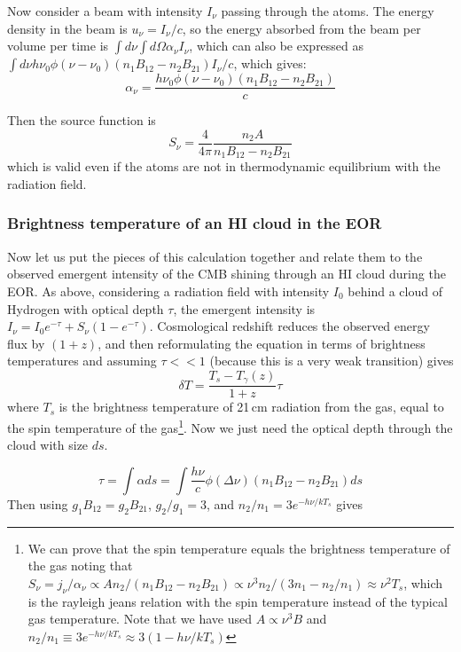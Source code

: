 Now consider a beam with intensity $I_\nu$ passing through the atoms. The energy density in the beam is $u_\nu=I_\nu/c$, so the energy absorbed from the beam per volume per time is $\int d\nu\int d\Omega\alpha_\nu I_\nu$, which can also be expressed as $\int d\nu h\nu_0\phi(\nu-\nu_0)(n_1B_{12}-n_2B_{21})I_\nu/c$, which gives:
\begin{equation}
\boxed{\alpha_\nu=\frac{h\nu_0\phi(\nu-\nu_0)(n_1B_{12}-n_2B_{21})}{c}}
\end{equation}

Then the source function is
\begin{equation}
\boxed{S_\nu=\frac{4}{4\pi}\frac{ n_2A}{n_1B_{12}-n_2B_{21}}}
\end{equation}
which is valid even if the atoms are not in thermodynamic equilibrium with the radiation field. 

\subsubsection{Brightness temperature of an HI cloud in the EOR}

Now let us put the pieces of this calculation together and relate them to the observed emergent intensity of the CMB shining through an HI cloud during the EOR. As above, considering a radiation field with intensity $I_0$ behind a cloud of Hydrogen with optical depth $\tau$, the emergent intensity is $I_\nu=I_0e^{-\tau}+S_\nu(1-e^{-\tau})$. Cosmological redshift reduces the observed energy flux by $(1+z)$, and then reformulating the equation in terms of brightness temperatures and assuming $\tau<<1$ (because this is a very weak transition) gives
\begin{equation}
\delta T=\frac{T_s-T_\gamma(z)}{1+z}\tau 
\end{equation}
where $T_s$ is the brightness temperature of 21\,cm radiation from the gas, equal to the spin temperature of the gas\footnote{We can prove that the spin temperature equals the brightness temperature of the gas noting that $S_\nu=j_\nu/\alpha_\nu\propto A n_2/(n_1B_{12}-n_2B_{21})\propto\nu^3n_2/(3n_1-n_2/n_1)\approx\nu^2 T_s$, which is the rayleigh jeans relation with the spin temperature instead of the typical gas temperature. Note that we have used  $A\propto\nu^3B$ and $n_2/n_1\equiv3e^{-h\nu/kT_s}\approx3(1-h\nu/kT_s)$}. Now we just need the optical depth through the cloud with size $ds$.

\begin{equation}
\tau=\int\alpha ds=\int\frac{h\nu}{c}\phi(\Delta\nu)(n_1B_{12}-n_2B_{21})ds
\end{equation}
Then using $g_1B_{12}=g_2B_{21}$, $g_2/g_1=3$, and $n_2/n_1=3e^{-h\nu/kT_s}$ gives

